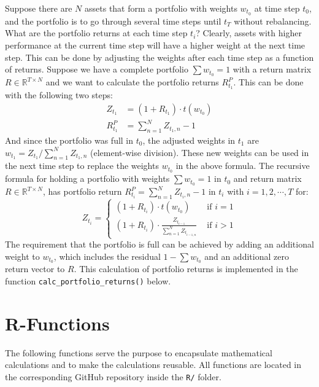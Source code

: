 \documentclass[
  oneside]{book}
\begin{document}
Suppose there are \(N\) assets that form a portfolio with weights \(w_{t_0}\) at time step \(t_0\), and the portfolio is to go through several time steps until \(t_T\) without rebalancing. What are the portfolio returns at each time step \(t_i\)? Clearly, assets with higher performance at the current time step will have a higher weight at the next time step. This can be done by adjusting the weights after each time step as a function of returns. Suppose we have a complete portfolio \(\textstyle\sum w_{t_0} = 1\) with a return matrix \(R \in \mathbb{R}^{T \times N}\) and we want to calculate the portfolio returns \(R_{t_1}^P\). This can be done with the following two steps:
\vspace{-0.1cm}
\begin{align*}
  Z_{t_1} &= (1+R_{t_1}) \cdot t(w_{t_0})\\
  R_{t_1}^P &= \sum_{n = 1}^N Z_{t_1, n} - 1
\end{align*}
And since the portfolio was full in \(t_0\), the adjusted weights in \(t_1\) are \(w_{t_1} = Z_{t_1}/\sum_{n = 1}^N Z_{t_1, n}\) (element-wise division). These new weights can be used in the next time step to replace the weights \(w_{t_0}\) in the above formula. The recursive formula for holding a portfolio with weights \(\textstyle\sum w_{t_0} = 1\) in \(t_0\) and return matrix \(R \in \mathbb{R}^{T \times N}\), has portfolio return \(R_{t_i}^P = \textstyle\sum_{n = 1}^N Z_{t_i, n} - 1\) in \(t_i\) with \(i=1, 2, \cdots, T\) for:\\
\[
  Z_{t_i} =
  \begin{cases}
  (1+R_{t_i})\cdot t(w_{t_0}) &\text{ if }i=1\\
  (1+R_{t_i})\cdot \frac{Z_{t_{i-1}}}{\sum_{n = 1}^N Z_{t_{i-1, n}}} &\text{ if }i>1
  \end{cases}
\]
The requirement that the portfolio is full can be achieved by adding an additional weight to \(w_{t_0}\), which includes the residual \(1-\textstyle\sum w_{t_0}\) and an additional zero return vector to \(R\). This calculation of portfolio returns is implemented in the function \texttt{calc\_portfolio\_returns()} below.

\hypertarget{r-functions-2}{%
\section{R-Functions}\label{r-functions-2}}

The following functions serve the purpose to encapsulate mathematical calculations and to make the calculations reusable. All functions are located in the corresponding GitHub repository inside the \texttt{R/} folder.
\end{document}
